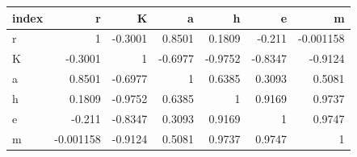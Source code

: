 \begin{tabular}{lrrrrrr}
\toprule
index & r & K & a & h & e & m \\
\midrule
r & 1 & -0.3001 & 0.8501 & 0.1809 & -0.211 & -0.001158 \\
K & -0.3001 & 1 & -0.6977 & -0.9752 & -0.8347 & -0.9124 \\
a & 0.8501 & -0.6977 & 1 & 0.6385 & 0.3093 & 0.5081 \\
h & 0.1809 & -0.9752 & 0.6385 & 1 & 0.9169 & 0.9737 \\
e & -0.211 & -0.8347 & 0.3093 & 0.9169 & 1 & 0.9747 \\
m & -0.001158 & -0.9124 & 0.5081 & 0.9737 & 0.9747 & 1 \\
\bottomrule
\end{tabular}
